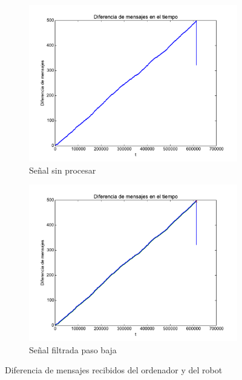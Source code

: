 \begin{figure}[]
	\centering
	\begin{subfigure}[b]{0.45\textwidth}
		\includegraphics[width=\linewidth]{imagenes/resultados/diferencia.pdf}
		\caption{Señal sin procesar}
		\label{fig:resultados/diferencia}
	\end{subfigure}
	\begin{subfigure}[b]{0.45\textwidth}
		\includegraphics[width=\linewidth]{imagenes/resultados/diferenciafilt.pdf}
		\caption{Señal filtrada paso baja}
		\label{fig:resultados/diferenciafilt}
	\end{subfigure}
	\caption{Diferencia de mensajes recibidos del ordenador y del robot}
\end{figure}

